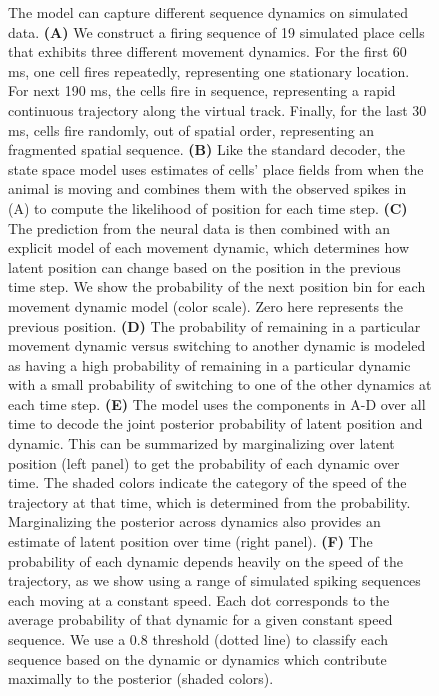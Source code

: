 \documentclass[times, twoside]{zHenriquesLab-StyleBioRxiv}
\begin{document}
\begin{figure}
\caption{The model can capture different sequence dynamics on simulated data. \textbf{(A)} We construct a firing sequence of 19 simulated place cells that exhibits three different movement dynamics. For the first 60 ms, one cell fires repeatedly, representing one stationary location. For next 190 ms, the cells fire in sequence, representing a rapid continuous trajectory along the virtual track. Finally, for the last 30 ms, cells fire randomly, out of spatial order, representing an fragmented spatial sequence. \textbf{(B)} Like the standard decoder, the state space model uses estimates of cells' place fields from when the animal is moving and combines them with the observed spikes in (A) to compute the likelihood of position for each time step. \textbf{(C)} The prediction from the neural data is then combined with an explicit model of each movement dynamic, which determines how latent position can change based on the position in the previous time step. We show the probability of the next position bin for each movement dynamic model (color scale). Zero here represents the previous position. \textbf{(D)} The probability of remaining in a particular movement dynamic versus switching to another dynamic is modeled as having a high probability of remaining in a particular dynamic with a small probability of switching to one of the other dynamics at each time step. \textbf{(E)} The model uses the components in A-D over all time to decode the joint posterior probability of latent position and dynamic. This can be summarized by marginalizing over latent position (left panel) to get the probability of each dynamic over time. The shaded colors indicate the category of the speed of the trajectory at that time, which is determined from the probability. Marginalizing the posterior across dynamics also provides an estimate of latent position over time (right panel). \textbf{(F)} The probability of each dynamic depends heavily on the speed of the trajectory, as we show using a range of simulated spiking sequences each moving at a constant speed. Each dot corresponds to the average probability of that dynamic for a given constant speed sequence. We use a 0.8 threshold (dotted line) to classify each sequence based on the dynamic or dynamics which contribute maximally to the posterior (shaded colors).
}
\label{1}
\end{figure}
\end{document}

